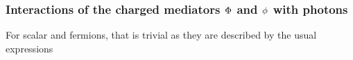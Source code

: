 \begin{comment}
In fact, at it is clear from the table, this only happens for the cases SVS (i.e. scalar DM coupled to a vector field $\medp_\mu$ and scalar DM$^+$) and VSS (vector DM coupled to only scalars). The corresponding Lagrangians are  
%
\begin{align}
{\cal L}_4^{(\text{SVS})} = - ie\,\left(g^{\tiny (1)}_1 +g^{\tiny (2)}_1\right) \text{DM} {\medp}^\mu  \text{DM}^- A_\mu   
+h.c.
%
\\ 
{\cal L}_4^{(\text{VSS})} = - ie\,  \left( g^{\tiny (1)}_{1}+ g^{\tiny (2)}_{1}\right)   \text{DM}^{\mu}\,\medp \text{DM}^-  A_\mu 
+
h.c.
\label{eq:L4}
\end{align}
\CG{Check this!!}
%
\end{comment}
\subsubsection{Interactions of the charged mediators ${\Phi}$ and ${\phi}$ with  photons}  
For scalar and fermions, that is trivial as they are described by the usual expressions


